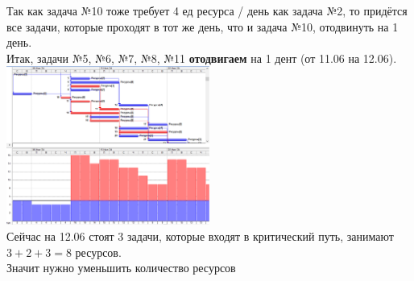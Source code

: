 \documentclass[14pt]{article}
\begin{document}
	Так как задача №10 тоже требует 4 ед ресурса / день как задача №2,
		то придётся все задачи, которые проходят в тот же день, что и задача №10, отодвинуть на 1 день.\\
	Итак, задачи №5, №6, №7, №8, №11 \textbf{отодвигаем} на 1 дент (от 11.06 на 12.06).\\
	\includegraphics[width=0.5\textwidth]{../img/ot1a1_6.png}\\
	Сейчас на 12.06 стоят 3 задачи, которые входят в критический путь, занимают $3+2+3=8$ ресурсов.\\
	Значит нужно уменьшить количество ресурсов
\end{document}

